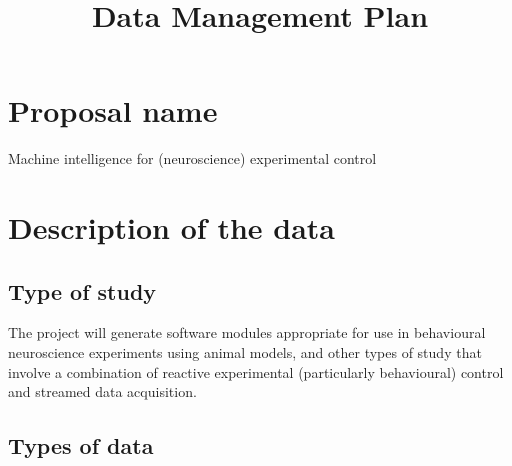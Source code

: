 \documentclass[a4paper,11pt]{article}
\title{Data Management Plan}
\author{}
\date{}
\begin{document}
\maketitle


\setcounter{section}{-1}

\section{Proposal name}


Machine intelligence for (neuroscience) experimental control

\section{Description of the data}
\subsection{Type of study}


The project will generate software modules appropriate for use in behavioural neuroscience experiments using animal models, and other types of study that involve a combination of reactive experimental (particularly behavioural) control and streamed data acquisition.  


\subsection{Types of data}
\end{document}
